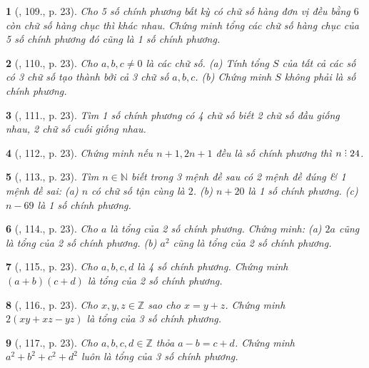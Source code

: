 \documentclass{article}
\newtheorem{baitoan}{}
\DeclareRobustCommand{\divby}{%
	\mathrel{\vbox{\baselineskip.65ex\lineskiplimit0pt\hbox{.}\hbox{.}\hbox{.}}}%
}
\begin{document}
\begin{baitoan}[\cite{Tuyen_Toan_8}, 109., p. 23]
	Cho 5 số chính phương bất kỳ có chữ số hàng đơn vị đều bằng $6$ còn chữ số hàng chục thì khác nhau. Chứng minh tổng các chữ số hàng chục của 5 số chính phương đó cũng là 1 số chính phương.
\end{baitoan}

\begin{baitoan}[\cite{Tuyen_Toan_8}, 110., p. 23]
	Cho $a,b,c\ne0$ là các chữ số. (a) Tính tổng $S$ của tất cả các số có 3 chữ số tạo thành bởi cả 3 chữ số $a,b,c$. (b) Chứng minh $S$ không phải là số chính phương.
\end{baitoan}

\begin{baitoan}[\cite{Tuyen_Toan_8}, 111., p. 23]
	Tìm 1 số chính phương có 4 chữ số biết 2 chữ số đầu giống nhau, 2 chữ số cuối giống nhau.
\end{baitoan}

\begin{baitoan}[\cite{Tuyen_Toan_8}, 112., p. 23]
	Chứng minh nếu $n + 1,2n + 1$ đều là số chính phương thì $n\divby24$.
\end{baitoan}

\begin{baitoan}[\cite{Tuyen_Toan_8}, 113., p. 23]
	Tìm $n\in\mathbb{N}$ biết trong 3 mệnh đề sau có 2 mệnh đề đúng \& 1 mệnh đề sai: (a) $n$ có chữ số tận cùng là $2$. (b) $n + 20$ là 1 số chính phương. (c) $n - 69$ là 1 số chính phương.
\end{baitoan}

\begin{baitoan}[\cite{Tuyen_Toan_8}, 114., p. 23]
	Cho $a$ là tổng của 2 số chính phương. Chứng minh: (a) $2a$ cũng là tổng của 2 số chính phương. (b) $a^2$ cũng là tổng của 2 số chính phương.
\end{baitoan}

\begin{baitoan}[\cite{Tuyen_Toan_8}, 115., p. 23]
	Cho $a,b,c,d$ là 4 số chính phương. Chứng minh $(a + b)(c + d)$ là tổng của 2 số chính phương.
\end{baitoan}

\begin{baitoan}[\cite{Tuyen_Toan_8}, 116., p. 23]
	Cho $x,y,z\in\mathbb{Z}$ sao cho $x = y + z$. Chứng minh $2(xy + xz - yz)$ là tổng của 3 số chính phương.
\end{baitoan}

\begin{baitoan}[\cite{Tuyen_Toan_8}, 117., p. 23]
	Cho $a,b,c,d\in\mathbb{Z}$ thỏa $a - b = c + d$. Chứng minh $a^2 + b^2 + c^2 + d^2$ luôn là tổng của 3 số chính phương.
\end{baitoan}
\end{document}
